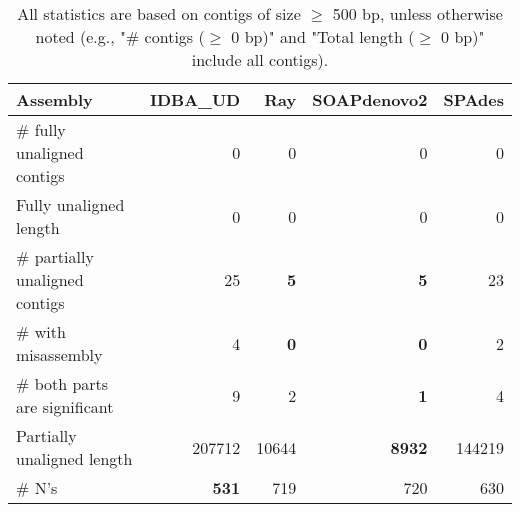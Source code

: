 \documentclass[12pt,a4paper]{article}
\begin{document}
\begin{table}[ht]
\begin{center}
\caption{All statistics are based on contigs of size $\geq$ 500 bp, unless otherwise noted (e.g., "\# contigs ($\geq$ 0 bp)" and "Total length ($\geq$ 0 bp)" include all contigs).}
\begin{tabular}{|l*{4}{|r}|}
\hline
Assembly & IDBA\_UD & Ray & SOAPdenovo2 & SPAdes \\ \hline
\# fully unaligned contigs & 0 & 0 & 0 & 0 \\ \hline
Fully unaligned length & 0 & 0 & 0 & 0 \\ \hline
\# partially unaligned contigs & 25 & {\bf 5} & {\bf 5} & 23 \\ \hline
\hspace{5mm}\# with misassembly & 4 & {\bf 0} & {\bf 0} & 2 \\ \hline
\hspace{5mm}\# both parts are significant & 9 & 2 & {\bf 1} & 4 \\ \hline
Partially unaligned length & 207712 & 10644 & {\bf 8932} & 144219 \\ \hline
\# N's & {\bf 531} & 719 & 720 & 630 \\ \hline
\end{tabular}
\end{center}
\end{table}
\end{document}
